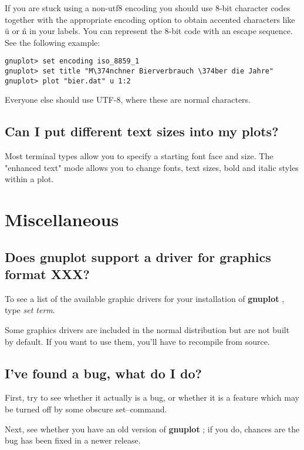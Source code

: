 \documentclass[a4paper,11pt]{article}
\newcommand{\gnuplot}{\textbf{gnuplot }}
\begin{document}
If you are stuck using a non-utf8 encoding you should use
8-bit character codes together with the appropriate encoding option
to obtain accented characters like \"u or \^n in your labels.
You can represent the 8-bit code with an escape sequence.
See the following example:

\small
\begin{verbatim}
gnuplot> set encoding iso_8859_1
gnuplot> set title "M\374nchner Bierverbrauch \374ber die Jahre"
gnuplot> plot "bier.dat" u 1:2
\end{verbatim}
\normalsize

Everyone else should use UTF-8, where these are normal characters.

\subsection{Can I put different text sizes into my plots?}

Most terminal types allow you to specify a starting font face and size.
The "enhanced text" mode allows you to change fonts, text sizes, bold and
italic styles within a plot.



\section{Miscellaneous}

\subsection{Does \gnuplot support a driver for graphics format XXX?}

To see a list of the available graphic drivers for your installation of
\gnuplot, type {\em set term}.

Some graphics drivers are included in the normal distribution
but are not built by default. If you want to use them, you'll
have to recompile from source.

\subsection{I've found a bug, what do I do?}

First, try to see whether it actually is a bug, or whether it
is a feature which may be turned off by some obscure set--command.

Next, see whether you have an old version of \gnuplot; if you do,
chances are the bug has been fixed in a newer release.
\end{document}
